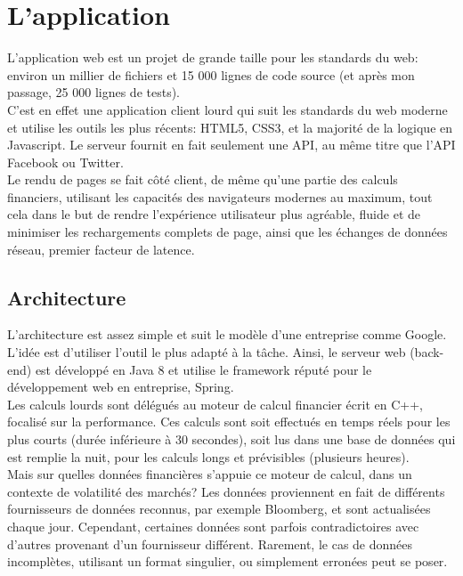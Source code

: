 \documentclass[a4paper,french,12pt]{article}
\begin{document}
\section{L'application}

			  L'application web est un projet de grande taille pour les standards du web: environ un millier de fichiers et 15 000 lignes de code source (et après mon passage, 25 000 lignes de tests).~\\	
			  
		  C'est en effet une application client lourd qui suit les standards du web moderne et utilise les outils les plus récents: HTML5, CSS3, et la majorité de la logique en Javascript. Le serveur fournit en fait seulement une API, au même titre que l'API Facebook ou Twitter.~\\	
		  
		  Le rendu de pages se fait côté client, de même qu'une partie des calculs financiers, utilisant les capacités des navigateurs modernes au maximum, tout cela dans le but de rendre l'expérience utilisateur plus agréable, fluide et de minimiser les rechargements complets de page, ainsi que les échanges de données réseau, premier facteur de latence.


	\subsection{Architecture}
		
		L'architecture est assez simple et suit le modèle d'une entreprise comme Google. L'idée est d'utiliser l'outil le plus adapté à la tâche.
		Ainsi, le serveur web (back-end) est développé en Java 8 et utilise le framework réputé pour le développement web en entreprise, Spring.~\\	
		
		Les calculs lourds sont délégués au moteur de calcul financier écrit en C++, focalisé sur la performance. Ces calculs sont soit effectués en temps réels pour les plus courts (durée inférieure à 30 secondes), soit lus dans une base de données qui est remplie la nuit, pour les calculs longs et prévisibles (plusieurs heures).~\\	
		
		Mais sur quelles données financières s'appuie ce moteur de calcul, dans un contexte de volatilité des marchés?
		Les données proviennent en fait de différents fournisseurs de données reconnus, par exemple Bloomberg, et sont actualisées chaque jour. Cependant, certaines données sont parfois contradictoires avec d'autres provenant d'un fournisseur différent. Rarement, le cas de données incomplètes, utilisant un format singulier, ou simplement erronées peut se poser. ~\\	
		
\end{document}
